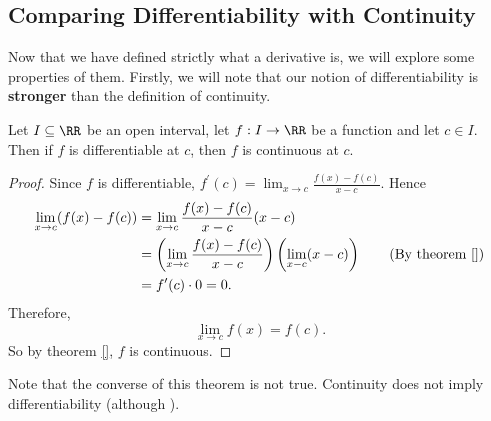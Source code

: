 \documentclass[../real_analysis.tex]{subfiles}
\begin{document}
        \subsection{Comparing Differentiability with Continuity}\label{subsec:comparing-differentiability-with-continuity}
            Now that we have defined strictly what a derivative is, we will explore some properties of them. Firstly, we will note that our notion of differentiability is \textbf{stronger} than the definition of continuity.
            \begin{theorem}\label{thm:diff-cts}
                Let $I\subseteq\RR$ be an open interval, let $f:I\to\RR$ be a function and let $c\in I$. Then if $f$ is differentiable at $c$, then $f$ is continuous at $c$.
            \end{theorem}
            \begin{proof}
                Since $f$ is differentiable, $f^\prime(c)=\lim_{x\to c}\frac{f(x)-f(c)}{x-c}$. Hence
                \begin{align}
                    \lim_{x\to c}(f(x)-f(c))&=\lim_{x\to c}\frac{f(x)-f(c)}{x-c}(x-c)\\
                    &=\left(\lim_{x\to c}\frac{f(x)-f(c)}{x-c}\right)\left(\lim_{x-c}(x-c)\right)\tag{By theorem \ref{}}\\ %
                    &=f^\prime(c)\cdot0=0.
                \end{align}
                Therefore,
                \begin{equation}
                    \lim_{x\to c}f(x)=f(c).
                \end{equation}
                So by theorem \ref{}, $f$ is continuous. %
            \end{proof}
            Note that the converse of this theorem is not true. Continuity does not imply differentiability (although ).
\end{document}
